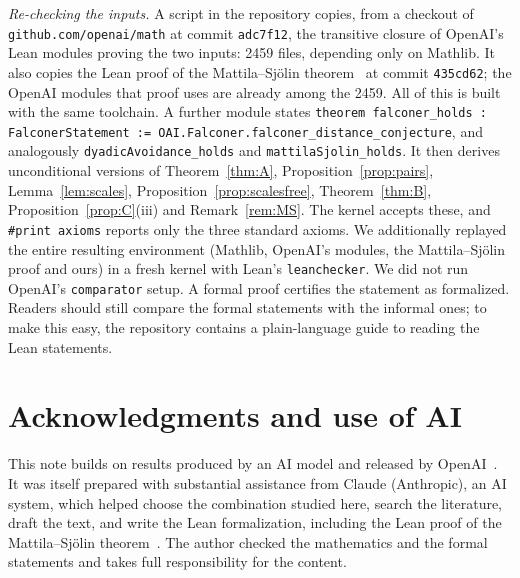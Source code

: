 \documentclass[11pt]{amsart}
\theoremstyle{definition}
\theoremstyle{remark}
\begin{document}
\begin{sloppypar}
\emph{Re-checking the inputs.} A script in the repository copies, from a checkout of
\texttt{github.com/openai/math} at commit \texttt{adc7f12}, the transitive closure of OpenAI's Lean
modules proving the two inputs: 2459 files, depending only on Mathlib. It also copies the
Lean proof of the Mattila--Sj\"olin theorem~\cite{SchillyMSLean} at commit \texttt{435cd62}; the
OpenAI modules that proof uses are already among the 2459. All of this is built with the same
toolchain. A further module states
\texttt{theorem falconer\_holds : FalconerStatement :=
OAI.Falconer.falconer\_distance\_conjecture}, and analogously \texttt{dyadicAvoidance\_holds}
and \texttt{mattilaSjolin\_holds}. It then derives unconditional versions of Theorem~\ref{thm:A},
Proposition~\ref{prop:pairs}, Lemma~\ref{lem:scales}, Proposition~\ref{prop:scalesfree},
Theorem~\ref{thm:B}, Proposition~\ref{prop:C}(iii) and Remark~\ref{rem:MS}. The kernel accepts these, and \texttt{\#print axioms} reports only
the three standard axioms. We additionally replayed the entire resulting environment (Mathlib,
OpenAI's modules, the Mattila--Sj\"olin proof and ours) in a fresh kernel with Lean's
\texttt{leanchecker}. We did not run
OpenAI's \texttt{comparator} setup. A formal proof certifies the statement as formalized. Readers
should still compare the formal statements with the informal ones; to make this easy, the
repository contains a plain-language guide to reading the Lean statements.
\end{sloppypar}

\section*{Acknowledgments and use of AI}
This note builds on results produced by an AI model and released by
OpenAI~\cite{OAIFalconer,OAIDyadic,OAIGeometric}.
It was itself prepared with substantial assistance from Claude (Anthropic), an AI system, which
helped choose the combination studied here, search the literature, draft the text, and write
the Lean formalization, including the Lean proof of the Mattila--Sj\"olin theorem~\cite{SchillyMSLean}. The author checked the mathematics and the formal statements and takes
full responsibility for the content.



\end{document}
